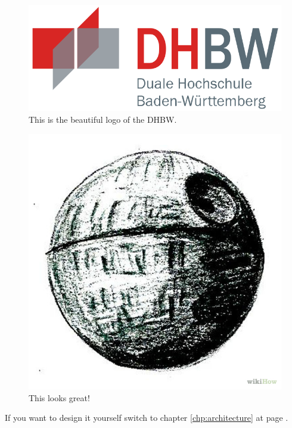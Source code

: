 \begin{figure}[H]
	\centering
	\includegraphics[width=\textwidth,scale=0.6]{images/dhbw.png}
	\caption[DHBW]{This is the beautiful logo of the DHBW.}
	\label{fig:dhbw_logo}
\end{figure}
\begin{figure}[H]
	\centering
	\includegraphics[scale=0.4]{images/death-star.jpg}
	\caption[Death Star]{This looks great! \cite{fig:deathstar}}
	\label{fig:dhbw_logo}
\end{figure}
If you want to design it yourself switch to chapter \ref{chp:architecture} at page \pageref{chp:architecture}.

